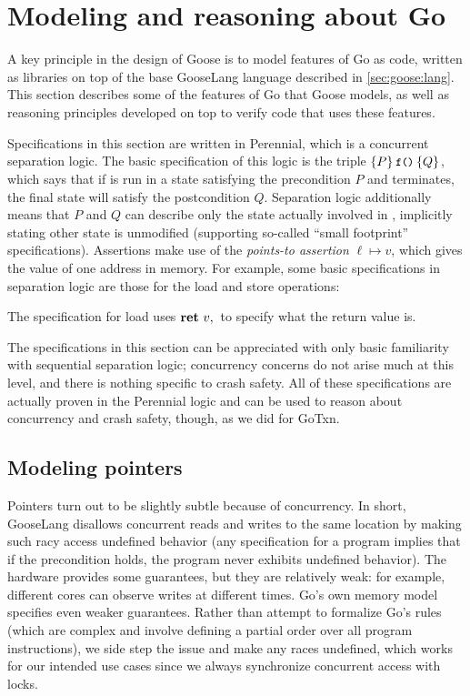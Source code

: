 \section{Modeling and reasoning about Go}%
\label{sec:goose:reasoning}

A key principle in the design of Goose is to model features of Go as code,
written as libraries on top of the base GooseLang language described in
\cref{sec:goose:lang}. This section describes some of the features of Go that
Goose models, as well as reasoning principles developed on top to verify code
that uses these features.

Specifications in this section are written in Perennial, which is a concurrent
separation logic. The basic specification of this logic is the triple
$\hoare{P}{\cc{f()}}{Q}$, which says that if  is run in a state
satisfying the precondition $P$ and terminates, the final state will satisfy the
postcondition $Q$. Separation logic additionally means that $P$ and $Q$ can
describe only the state actually involved in , implicitly stating other
state is unmodified (supporting so-called ``small footprint'' specifications).
Assertions make use of the \emph{points-to assertion} $\ell \mapsto v$, which
gives the value of one address in memory. For example, some basic specifications
in separation logic are those for the load and store operations:
%
\begin{mathpar}

\end{mathpar}

The specification for load uses $\Ret{v}$ to specify what the return value is.

The specifications in this section can be appreciated with only basic
familiarity with sequential separation logic; concurrency concerns do not arise
much at this level, and there is nothing specific to crash safety. All of these
specifications are actually proven in the Perennial logic and can be used to
reason about concurrency and crash safety, though, as we did for GoTxn.

\subsection{Modeling pointers}%
\label{sec:goose:pointers}

Pointers turn out to be slightly subtle because of concurrency. In
short, GooseLang disallows concurrent reads and writes to the same
location by making such racy access undefined behavior (any
specification for a program implies that if the precondition holds, the
program never exhibits undefined behavior). The hardware provides some
guarantees, but they are relatively weak: for example, different cores
can observe writes at different times. Go's own memory model specifies
even weaker guarantees. Rather than attempt to formalize Go's rules
(which are complex and involve defining a partial order over all program
instructions), we side step the issue and make any races undefined,
which works for our intended use cases since we always synchronize
concurrent access with locks.

